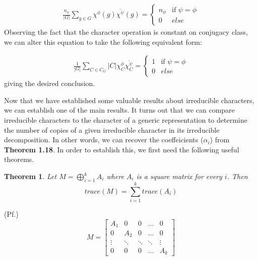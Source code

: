 \documentclass[10pt]{ucthesis}
\newtheorem{theorem}[definition]{Theorem}
\begin{document}
\begin{equation}
	\begin{aligned}
		\frac{n_\phi}{|G|} \sum_{g\in G} \chi^\phi(g) \overline{\chi^\psi}(g) = \begin{cases}
																						n_\phi & \text{if } \psi = \phi \\
																						0 & else
																					 \end{cases}
	\end{aligned}
\end{equation}
Observing the fact that the character operation is constant on conjugacy class, we can alter this equation to take the following equivalent form:

\begin{equation}
	\begin{aligned}
		\frac{1}{|G|} \sum_{C\in C_G} |C| \chi^\phi_C \overline{\chi^\psi_C}= \begin{cases}
																						1 & \text{if } \psi = \phi \\
																						0 & else
																					 \end{cases}
	\end{aligned}
\end{equation}
giving the desired conclusion. \cite{Tung} \qedsymbol

Now that we have established some valuable results about irreducible characters, we can establish one of the main results. It turns out that we can compare irreducible characters to the character of a generic representation to determine the number of copies of a given irreducible character in its irreducible decomposition. In other words, we can recover the coeffeicients ($\alpha_i$) from \textbf{Theorem 1.18}. In order to establish this, we first need the following useful theorems.

\begin{theorem}
	Let $M = \bigoplus_{i=1}^k A_i$ where $A_i$ is a square matrix for every $i$. Then $$trace(M) = \sum_{i=1}^k trace(A_i)$$
\end{theorem} 

\noindent (Pf.) $$M = \begin{bmatrix}
						A_1 & 0 & 0 & \hdots & 0 \\
						0 & A_2 & 0 & \hdots & 0 \\
						\vdots & \ddots & \ddots & \ddots & \vdots \\
						0 & 0 & 0 & \hdots & A_k
					\end{bmatrix}$$
\end{document}
